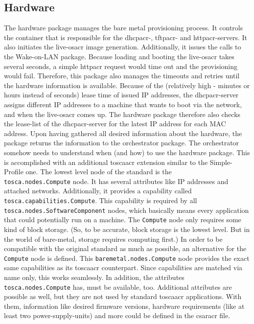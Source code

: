 \subsection{Hardware}
The hardware package manages the bare metal provisioning process. It controls the container that is responsible for the \gls{dhcpacr}-, \gls{tftpacr}- and \gls{httpacr}-servers. It also initiates the live-\gls{osacr} image generation. Additionally, it issues the calls to the Wake-on-LAN package. Because loading and booting the live-\gls{osacr} takes several seconds, a simple \gls{httpacr} request would time out and the provisioning would fail. Therefore, this package also manages the timeouts and retries until the hardware information is available. Because of the (relatively high - minutes or hours instead of seconds) lease time of issued IP addresses, the \gls{dhcpacr}-server assigns different IP addresses to a machine that wants to boot via the network, and when the live-\gls{osacr} comes up. The hardware package therefore also checks the lease-list of the \gls{dhcpacr}-server for the latest IP address for each MAC address.
\newline
Upon having gathered all desired information about the hardware, the package returns the information to the orchestrator package.
\newline
The orchestrator somehow needs to understand when (and how) to use the hardware package. This is accomplished with an additional \gls{toscaacr} extension similar to the Simple-Profile one. The lowest level node of the standard is the \\
\texttt{tosca.nodes.Compute} node. It has several attributes like IP addresses and attached networks. Additionally, it provides a capability called \texttt{tosca.capabilities.Compute}. This capability is required by all \texttt{tosca.nodes.SoftwareComponent} nodes, which basically means every application that could potentially run on a machine. The \texttt{Compute} node only requires some kind of block storage. (So, to be accurate, block storage is the lowest level. But in the world of bare-metal, storage requires computing first.)
\newline
In order to be compatible with the original standard as much as possible, an alternative for the \texttt{Compute} node is defined. This \texttt{baremetal.nodes.Compute} node provides the exact same capabilities as its \gls{toscaacr} counterpart. Since capabilities are matched via name only, this works seamlessly. In addition, the attributes \texttt{tosca.nodes.Compute} has, must be available, too. Additional attributes are possible as well, but they are not used by standard \gls{toscaacr} applications. With them, information like desired firmware versions, hardware requirements (like at least two power-supply-units) and more could be defined in the \gls{csaracr} file. 
